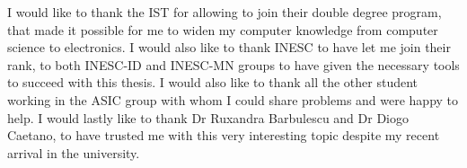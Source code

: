 
\begin{acknowledgments}

  I would like to thank the \ac{IST} for allowing to join their double degree program, that made it possible for me to widen my computer knowledge from computer science to electronics.
  I would also like to thank \ac{INESC} to have let me join their rank, to both \ac{INESC}-ID and \ac{INESC}-MN groups to have given the necessary tools to succeed with this thesis.
  I would also like to thank all the other student working in the \ac{ASIC} group with whom I could share problems and were happy to help.
  I would lastly like to thank Dr Ruxandra Barbulescu and Dr Diogo Caetano, to have trusted me with this very interesting topic despite my recent arrival in the university.

\end{acknowledgments}
\clearpage
\thispagestyle{empty}
\cleardoublepage
